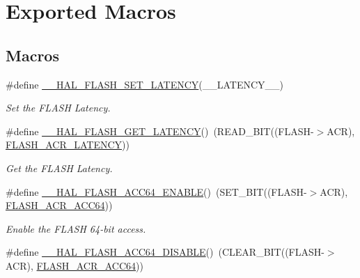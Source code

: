\hypertarget{group___f_l_a_s_h_ex___exported___macros}{\section{Exported Macros}
\label{group___f_l_a_s_h_ex___exported___macros}
}
\subsection*{Macros}
\begin{DoxyCompactItemize}
\item 
\#define \hyperlink{group___f_l_a_s_h_ex___exported___macros_gac1c9f459b798cc3700b90a6245df5a1a}{\-\_\-\-\_\-\-H\-A\-L\-\_\-\-F\-L\-A\-S\-H\-\_\-\-S\-E\-T\-\_\-\-L\-A\-T\-E\-N\-C\-Y}(\-\_\-\-\_\-\-L\-A\-T\-E\-N\-C\-Y\-\_\-\-\_\-)
\begin{DoxyCompactList}\small\item\em Set the F\-L\-A\-S\-H Latency. \end{DoxyCompactList}\item 
\#define \hyperlink{group___f_l_a_s_h_ex___exported___macros_gaa537e44d74ce35ff5bfef80edf03f895}{\-\_\-\-\_\-\-H\-A\-L\-\_\-\-F\-L\-A\-S\-H\-\_\-\-G\-E\-T\-\_\-\-L\-A\-T\-E\-N\-C\-Y}()~(R\-E\-A\-D\-\_\-\-B\-I\-T((F\-L\-A\-S\-H-\/$>$A\-C\-R), \hyperlink{group___peripheral___registers___bits___definition_gaef5e44cbb084160a6004ca9951ec7318}{F\-L\-A\-S\-H\-\_\-\-A\-C\-R\-\_\-\-L\-A\-T\-E\-N\-C\-Y}))
\begin{DoxyCompactList}\small\item\em Get the F\-L\-A\-S\-H Latency. \end{DoxyCompactList}\item 
\#define \hyperlink{group___f_l_a_s_h_ex___exported___macros_gaba318ae34e00b0110240a22ae026834a}{\-\_\-\-\_\-\-H\-A\-L\-\_\-\-F\-L\-A\-S\-H\-\_\-\-A\-C\-C64\-\_\-\-E\-N\-A\-B\-L\-E}()~(S\-E\-T\-\_\-\-B\-I\-T((F\-L\-A\-S\-H-\/$>$A\-C\-R), \hyperlink{group___peripheral___registers___bits___definition_gac469106633ce3df56306668ff4da0451}{F\-L\-A\-S\-H\-\_\-\-A\-C\-R\-\_\-\-A\-C\-C64}))
\begin{DoxyCompactList}\small\item\em Enable the F\-L\-A\-S\-H 64-\/bit access. \end{DoxyCompactList}\item 
\#define \hyperlink{group___f_l_a_s_h_ex___exported___macros_ga6822b67e0b0da1d4283719e152c6d409}{\-\_\-\-\_\-\-H\-A\-L\-\_\-\-F\-L\-A\-S\-H\-\_\-\-A\-C\-C64\-\_\-\-D\-I\-S\-A\-B\-L\-E}()~(C\-L\-E\-A\-R\-\_\-\-B\-I\-T((F\-L\-A\-S\-H-\/$>$A\-C\-R), \hyperlink{group___peripheral___registers___bits___definition_gac469106633ce3df56306668ff4da0451}{F\-L\-A\-S\-H\-\_\-\-A\-C\-R\-\_\-\-A\-C\-C64}))

\end{DoxyCompactItemize}
